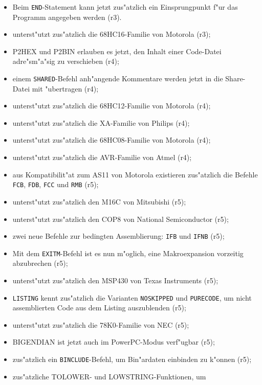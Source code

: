 \documentclass[12pt,a4paper,twoside]{report}
\newcommand{\tty}[1]{{\tt #1}}
\begin{document}
{\begin{itemize}
{\begin{itemize}
{            ausgegeben werden (r3);}
      \item{Beim \tty{END}-Statement kann jetzt zus"atzlich ein
            Einsprungpunkt f"ur das Programm angegeben werden (r3).}
      \item{unterst"utzt zus"atzlich die 68HC16-Familie von Motorola (r3);}
      \item{P2HEX und P2BIN erlauben es jetzt, den Inhalt einer Code-Datei 
            adre"sm"a"sig zu verschieben (r4);}
      \item{einem \tty{SHARED}-Befehl anh"angende Kommentare werden jetzt
            in die Share-Datei mit "ubertragen (r4);}
      \item{unterst"utzt zus"atzlich die 68HC12-Familie von Motorola (r4);}
      \item{unterst"utzt zus"atzlich die XA-Familie von Philips (r4);}
      \item{unterst"utzt zus"atzlich die 68HC08-Familie von Motorola (r4);}
      \item{unterst"utzt zus"atzlich die AVR-Familie von Atmel (r4);}
      \item{aus Kompatibilit"at zum AS11 von Motorola existieren zus"atzlich
            die Befehle \tty{FCB}, \tty{FDB}, \tty{FCC} und \tty{RMB} (r5);}
      \item{unterst"utzt zus"atzlich den M16C von Mitsubishi (r5);}
      \item{unterst"utzt zus"atzlich den COP8 von National Semiconductor
            (r5);}
      \item{zwei neue Befehle zur bedingten Assemblierung: \tty{IFB} und 
            \tty{IFNB} (r5);}
      \item{Mit dem \tty{EXITM}-Befehl ist es nun m"oglich, eine 
            Makroexpansion vorzeitig abzubrechen (r5);}
      \item{unterst"utzt zus"atzlich den MSP430 von Texas Instruments
            (r5);}
      \item{\tty{LISTING} kennt zus"atzlich die Varianten
            \tty{NOSKIPPED} und \tty{PURECODE}, um nicht assemblierten 
            Code aus dem Listing auszublenden (r5);}
      \item{unterst"utzt zus"atzlich die 78K0-Familie von NEC (r5);}
      \item{BIGENDIAN ist jetzt auch im PowerPC-Modus verf"ugbar (r5);}
      \item{zus"atzlich ein \tty{BINCLUDE}-Befehl, um Bin"ardaten 
            einbinden zu k"onnen (r5);}
      \item{zus"atzliche TOLOWER- und LOWSTRING-Funktionen, um
}
\end{itemize}}
\end{itemize}}
\end{document}
